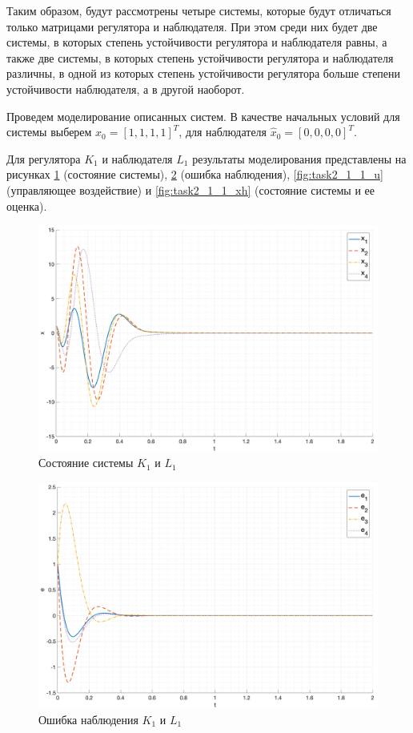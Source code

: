 Таким образом, будут рассмотрены четыре системы, которые будут отличаться только матрицами регулятора и наблюдателя.
При этом среди них будет две системы, в которых степень устойчивости регулятора и наблюдателя равны, 
а также две системы, в которых степень устойчивости регулятора и наблюдателя различны, в одной из которых
степень устойчивости регулятора больше степени устойчивости наблюдателя, а в другой наоборот.

Проведем моделирование описанных систем. В качестве начальных условий для системы выберем $x_0 = [1, 1, 1, 1]^T$, 
для наблюдателя $\hat{x}_0 = [0, 0, 0, 0]^T$. 

Для регулятора $K_1$ и наблюдателя $L_1$ результаты моделирования представлены на рисунках \ref{fig:task2_1_1_x} 
(состояние системы), \ref{fig:task2_1_1_e} (ошибка наблюдения), \ref{fig:task2_1_1_u} (управляющее воздействие) и \ref{fig:task2_1_1_xh} 
(состояние системы и ее оценка).
\begin{figure}[ht!]
    \centering
    \includegraphics[width=\textwidth]{media/plots/task2_1_x.png}
    \caption{Состояние системы $K_1$ и $L_1$}
    \label{fig:task2_1_1_x}
\end{figure}
\begin{figure}[ht!]
    \centering
    \includegraphics[width=\textwidth]{media/plots/task2_1_e.png}
    \caption{Ошибка наблюдения $K_1$ и $L_1$}
    \label{fig:task2_1_1_e}
\end{figure}
